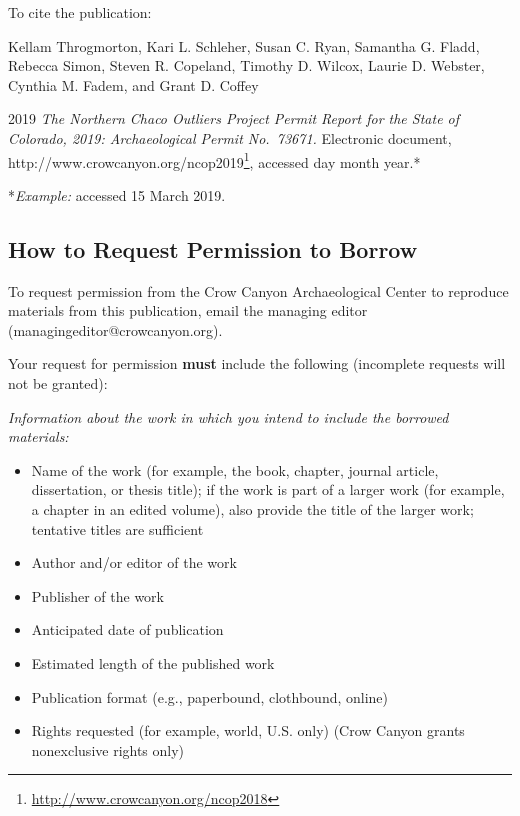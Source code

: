 \documentclass[
  12pt,
]{krantz}
\renewcommand{\href}[2]{#2\footnote{\url{#1}}}
\begin{document}
To cite the publication:

Kellam Throgmorton, Kari L. Schleher, Susan C. Ryan, Samantha G. Fladd,
Rebecca Simon, Steven R. Copeland, Timothy D. Wilcox, Laurie D. Webster,
Cynthia M. Fadem, and Grant D. Coffey

2019 \emph{The Northern Chaco Outliers Project Permit Report for the State of
Colorado, 2019: Archaeological Permit No.~73671.} Electronic document,
\href{http://www.crowcanyon.org/ncop2018}{http://www.crowcanyon.org/ncop2019},
accessed day month year.*

*\emph{Example:} accessed 15 March 2019.

\hypertarget{how-to-request-permission-to-borrow}{%
\subsection*{How to Request Permission to Borrow}\label{how-to-request-permission-to-borrow}}

To request permission from the Crow Canyon Archaeological Center to
reproduce materials from this publication, email the managing editor
(managingeditor@crowcanyon.org).

Your request for permission \textbf{must} include the following (incomplete
requests will not be granted):

\emph{Information about the work in which you intend to include the borrowed
materials:}

\begin{itemize}
\item
  Name of the work (for example, the book, chapter, journal article,
  dissertation, or thesis title); if the work is part of a larger work
  (for example, a chapter in an edited volume), also provide the title of
  the larger work; tentative titles are sufficient
\item
  Author and/or editor of the work
\item
  Publisher of the work
\item
  Anticipated date of publication
\item
  Estimated length of the published work
\item
  Publication format (e.g., paperbound, clothbound, online)
\item
  Rights requested (for example, world, U.S. only) (Crow Canyon grants
  nonexclusive rights only)
\end{itemize}
\end{document}
